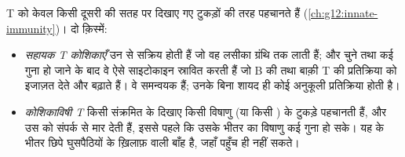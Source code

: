 \begin{proposition}[T लसीकाणु]\label{prop:g12:adaptive-immunity:tcells}
T   को केवल किसी दूसरी  की सतह पर दिखाए गए टुकड़ों की
तरह पहचानते हैं (\cref{ch:g12:innate-immunity})। दो क़िस्में:
\begin{itemize}
  \item \emph{सहायक T कोशिकाएँ} उन 
        से सक्रिय होती हैं जो वह  लसीका ग्रंथि तक लाती हैं; और चुने
        तथा कई गुना हो जाने के बाद वे ऐसे साइटोकाइन स्रावित करती हैं जो B
         की तथा बाक़ी T  की प्रतिक्रिया को इजाज़त देते और
        बढ़ाते हैं। वे समन्वयक हैं; उनके बिना शायद ही कोई अनुकूली
        प्रतिक्रिया होती है।
  \item \emph{कोशिकाविषी T } किसी संक्रमित  के दिखाए किसी
        विषाणु (या किसी  ) के टुकड़े पहचानती हैं, और उस 
        को संपर्क से मार देती हैं, इससे पहले कि उसके भीतर का विषाणु कई गुना
        हो सके। यह  के भीतर छिपे घुसपैठियों के ख़िलाफ़ वाली बाँह
        है, जहाँ  पहुँच ही नहीं सकते।
\end{itemize}
\end{proposition}
\admitted

